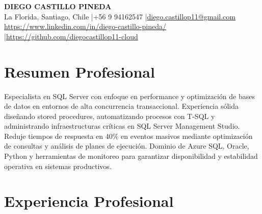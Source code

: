 \documentclass[11pt,letterpaper]{article}
\begin{document}
\begin{center}
{\fontsize{16}{19}\selectfont\textbf{\MakeUppercase{Diego Castillo Pineda}}}\\[4pt]
{\small La Florida, Santiago, Chile \quad|\quad +56 9 94162547 \quad|\quad \href{mailto:diego.castillop11@gmail.com}{diego.castillop11@gmail.com}\\
\href{https://https://www.linkedin.com/in/diego-castillo-pineda/}{https://www.linkedin.com/in/diego-castillo-pineda/} \quad|\quad \href{https://https://github.com/diegocastillop11-cloud}{https://github.com/diegocastillop11-cloud}}
\end{center}

\section{Resumen Profesional}
Especialista en SQL Server con enfoque en performance y optimización de bases de datos en entornos de alta concurrencia transaccional. Experiencia sólida diseñando stored procedures, automatizando procesos con T-SQL y administrando infraestructuras críticas en SQL Server Management Studio. Reduje tiempos de respuesta en 40\% en eventos masivos mediante optimización de consultas y análisis de planes de ejecución. Dominio de Azure SQL, Oracle, Python y herramientas de monitoreo para garantizar disponibilidad y estabilidad operativa en sistemas productivos.

\section{Experiencia Profesional}
\end{document}
